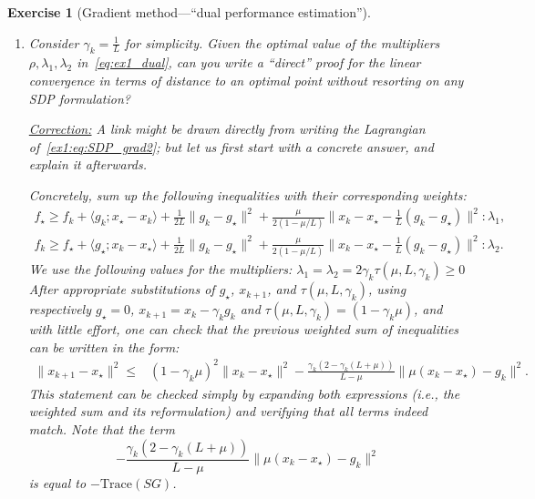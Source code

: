 \documentclass[11pt,a4paper]{article}
\newcommand{\correction}[1]{{{\color{blue}\underline{Correction:} #1}}}
\newcommand{\correction}[1]{}
\newtheorem{exercise}{Exercise}
\begin{document}
\begin{exercise}[Gradient method---``dual performance estimation'']
\begin{enumerate}
	\item Consider $\gamma_k=\frac{1}{L}$ for simplicity. Given the optimal value of the multipliers $\rho,\lambda_1,\lambda_2$ in~\eqref{eq:ex1_dual}, can you write a ``direct'' proof for the linear convergence in terms of distance to an optimal point without resorting on any SDP formulation?
	
	\correction{A link might be drawn directly from writing the Lagrangian of~\eqref{ex1:eq:SDP_grad2}; but let us first start with a concrete answer, and explain it afterwards.
	
	
	Concretely, sum up the following inequalities with their corresponding weights: $$\begin{array}{r}     f_\star \geqslant      f_k+\langle{g_k};{x_\star-x_k}\rangle+\frac{1}{2L}\lVert{g_k-g_\star}\rVert^2+\frac{\mu}{2(1-\mu/L)}\lVert{x_k-x_\star-\frac{{1}}{L}(g_k-g_\star)}\rVert^2  :\lambda_1,  \\     f_k \geqslant      f_\star+\langle{g_\star};{x_k-x_\star}\rangle+\frac{1}{2L}\lVert{g_k-g_\star}\rVert^2+\frac{\mu}{2(1-\mu/L)}\lVert{x_k-x_\star-\frac{{1}}{L}(g_k-g_\star)}\rVert^2:\lambda_2.     \end{array}$$ We use the following values for the multipliers: $\lambda_1=\lambda_2=2\gamma_k\tau(\mu,L,\gamma_k) \geqslant      0$
After appropriate substitutions of $g_\star$, $x_{k+1}$, and $\tau(\mu,L,\gamma_k)$, using respectively $g_\star=0$, $x_{k+1}=x_k-\gamma_k g_k$ and $\tau(\mu,L,\gamma_k)=(1-\gamma_k\mu)$, and with little effort, one can check that the previous weighted sum of inequalities can be written in the form: $$ \begin{array}{rl}    \lVert{x_{k+1}-x_\star}\rVert^2  \leqslant      & \left(1-\gamma_k \mu \right)^2\lVert{x_{k}-x_\star}\rVert^2 -\frac{\gamma_k(2-\gamma_k (L+\mu))}{L-\mu} \lVert{\mu {(x_k  -x_\star)} - g_k}\rVert^2. \end{array}$$ This statement can be checked simply by expanding both expressions (i.e., the weighted sum and its reformulation) and verifying that all terms indeed match. Note that the term \[-\frac{\gamma_k(2-\gamma_k (L+\mu))}{L-\mu} \lVert{\mu {(x_k  -x_\star)} - g_k}\rVert^2\] is equal to $-\mathrm{Trace}(SG)$.

}
\end{enumerate}
\end{exercise}
\end{document}
